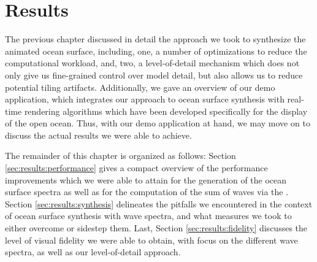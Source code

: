 \chapter{Results}
\label{ch:results}
%

The previous chapter discussed in detail the approach we took to synthesize
the animated ocean surface, including, one, a number of optimizations to reduce
the computational workload, and, two, a level-of-detail mechanism which does
not only give us fine-grained control over model detail, but also allows us to
reduce potential tiling artifacts. Additionally, we gave an overview of our demo
application, which integrates our approach to ocean surface synthesis
with real-time rendering algorithms which have been developed specifically for
the display of the open ocean.
Thus, with our demo application at hand, we may move on to discuss the
actual results we were able to achieve.

The remainder of this chapter is organized as follows:
Section \ref{sec:results:performance} gives a compact overview of the performance
improvements which we were able to attain for the generation of the ocean
surface spectra as well as for the computation of the sum of waves via the
\InvFourierTransform.
Section \ref{sec:results:synthesis} delineates the pitfalls we encountered
in the context of ocean surface synthesis with wave spectra, and what measures
we took to either overcome or sidestep them.
Last, Section \ref{sec:results:fidelity} discusses the level of visual fidelity
we were able to obtain, with focus on the different wave spectra, as well as
our level-of-detail approach.
%
